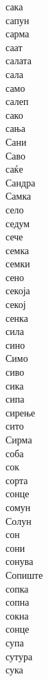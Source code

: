\documentclass[a5paper,12pt]{article}
\newenvironment{activity}[1]{%
  \begin{tcolorbox}[colback=boxcolor,colframe=titlecolor,title={\textbf{#1}},fonttitle=\bfseries]
}{%
  \end{tcolorbox}
}
\begin{document}
\begin{activity}{Зборчиња} %
\begin{multicols}{4}
сака\\ сапун\\ сарма\\ саат\\ салата\\ сала\\ само\\ салеп\\ сако\\ сања\\ Сани\\ Саво\\ саќе\\ Сандра\\ Самка\\ село\\ седум\\ сече\\ семка\\ семки\\ сено\\ секоја\\ секој\\ сенка\\ сила\\
сино\\ Симо\\ сиво\\ сика\\ сипа\\ сирење\\ сито\\ Сирма\\ соба\\ сок\\ сорта\\ сонце\\ сомун\\ Солун\\ сон\\ сони\\ сонува\\ Сопиште\\ сопка\\ сопна\\ сокна\\ сонце\\ супа\\ сутура\\ сука\\

\end{multicols}
\end{activity}
\end{document}
